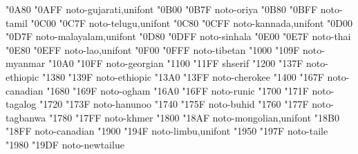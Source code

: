 \documentclass{article}
\begin{document}
                                       {  "0A80} {  "0AFF} {noto-gujarati,unifont}
                                          {  "0B00} {  "0B7F} {noto-oriya}
                                          {  "0B80} {  "0BFF} {noto-tamil}
                                         {  "0C00} {  "0C7F} {noto-telugu,unifont}
                                        {  "0C80} {  "0CFF} {noto-kannada,unifont}
                                      {  "0D00} {  "0D7F} {noto-malayalam,unifont}
                                        {  "0D80} {  "0DFF} {noto-sinhala}
                                           {  "0E00} {  "0E7F} {noto-thai}
                                            {  "0E80} {  "0EFF} {noto-lao,unifont}
                                        {  "0F00} {  "0FFF} {noto-tibetan}
                                        {  "1000} {  "109F} {noto-myanmar}
                                       {  "10A0} {  "10FF} {noto-georgian}
                                    {  "1100} {  "11FF} {shserif}
                                       {  "1200} {  "137F} {noto-ethiopic}
                            {  "1380} {  "139F} {noto-ethiopic}
                                       {  "13A0} {  "13FF} {noto-cherokee}
          {  "1400} {  "167F} {noto-canadian}
                                          {  "1680} {  "169F} {noto-ogham}
                                          {  "16A0} {  "16FF} {noto-runic}
                                        {  "1700} {  "171F} {noto-tagalog}
                                        {  "1720} {  "173F} {noto-hanunoo}
                                          {  "1740} {  "175F} {noto-buhid}
                                       {  "1760} {  "177F} {noto-tagbanwa}
                                          {  "1780} {  "17FF} {noto-khmer}
                                      {  "1800} {  "18AF} {noto-mongolian,unifont}
 {  "18B0} {  "18FF} {noto-canadian}
                                          {  "1900} {  "194F} {noto-limbu,unifont}
                                         {  "1950} {  "197F} {noto-taile}
                                    {  "1980} {  "19DF} {noto-newtailue}
\end{document}
